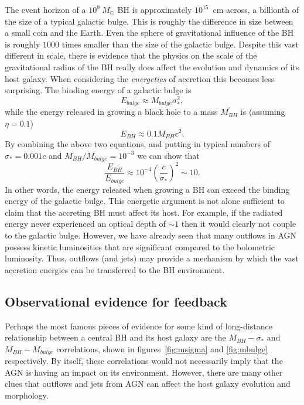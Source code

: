 The event horizon of a $10^9~M_\odot$ BH is approximately 
$10^{15}$~cm across, a billionth of the size of a typical galactic bulge. This is 
roughly the difference in size between a small coin and the 
Earth. Even the sphere of gravitational influence of the BH is roughly 
$1000$ times smaller than the size of the galactic bulge.
Despite this vast different in scale, there is evidence
that the physics on the scale of the gravitational
radius of the BH really does affect the evolution and dynamics of its host galaxy.
When considering the {\em energetics} of accretion this becomes less surprising.
The binding energy of a galactic bulge is 
\begin{equation}
E_{bulge} \approx M_{bulge} \sigma_*^2,
\end{equation}
while the energy released in growing a black hole to a 
mass $M_{BH}^\prime$ is (assuming $\eta=0.1$)
\begin{equation}
E_{BH} \approx 0.1 M_{BH} c^2.  
\end{equation}
By combining the above two equations, and putting in typical numbers of
$\sigma_* = 0.001c$ and $M_{BH} / M_{bulge} = 10^{-3}$ we can show that 
\begin{equation}
\frac{E_{BH}}{E_{bulge}} \approx 10^{-4} \left( \frac{c}{\sigma_*} \right)^2 \sim 10.
\end{equation}
In other words, the energy released when growing a BH can exceed
the binding energy of the galactic bulge. This energetic 
argument is not alone sufficient to claim that the accreting BH must affect its
host. For example, if the radiated energy never experienced an 
optical depth of $\sim 1$ then it would clearly not couple to the galactic bulge. However,
we have already seen that many outflows in AGN possess kinetic luminosities that
are significant compared to the bolometric luminosity. Thus, outflows 
(and jets) may provide a mechanism by which the vast accretion energies can
be transferred to the BH environment.

\subsection{Observational evidence for feedback}

Perhaps the most famous pieces of evidence for some kind of long-distance 
relationship between a central BH and its host galaxy are the 
$M_{BH}-\sigma_*$ and $M_{BH}-M_{bulge}$ correlations, 
shown in figures~\ref{fig:msigma} and \ref{fig:mbulge} respectively.
By itself, these correlations would not necessarily imply
that the AGN is having an impact on its environment. However, there
are many other clues that outflows and jets from AGN can affect
the host galaxy evolution and morphology.

